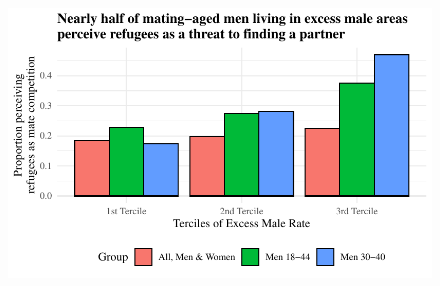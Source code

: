 \documentclass[
]{article}
\begin{document}
\begin{figure}[H]

{\centering \includegraphics{paper_files/figure-pdf/unnamed-chunk-2-1.pdf}

}

\end{figure}

\clearpage
\end{document}
